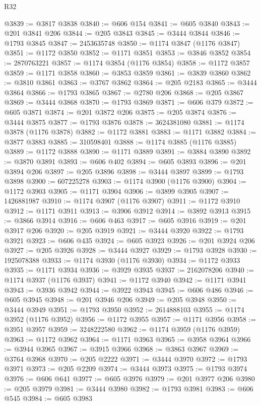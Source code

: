 \begin{lexlean}{R32}
\begin{coremodule}
@3839 := @3817 @3838
@3840 := @606 @154
@3841 := @605 @3840
@3843 := @201 @3841 @206
@3844 := @205 @3843
@3845 := @3444 @3844
@3846 := @1793 @3845
@3847 := 2453635748
@3850 := @1174 @3847 (@1176 @3847)
@3851 := @1172 @3850
@3852 := @1171 @3851
@3853 := @3846 @3852
@3854 := 2870763221
@3857 := @1174 @3854 (@1176 @3854)
@3858 := @1172 @3857
@3859 := @1171 @3858
@3860 := @3853 @3859
@3861 := @3839 @3860
@3862 := @3810 @3861
@3863 := @3767 @3862
@3864 := @205 @2183
@3865 := @3444 @3864
@3866 := @1793 @3865
@3867 := @2780 @206
@3868 := @205 @3867
@3869 := @3444 @3868
@3870 := @1793 @3869
@3871 := @606 @379
@3872 := @605 @3871
@3874 := @201 @3872 @206
@3875 := @205 @3874
@3876 := @3444 @3875
@3877 := @1793 @3876
@3878 := 3624381080
@3881 := @1174 @3878 (@1176 @3878)
@3882 := @1172 @3881
@3883 := @1171 @3882
@3884 := @3877 @3883
@3885 := 310598401
@3888 := @1174 @3885 (@1176 @3885)
@3889 := @1172 @3888
@3890 := @1171 @3889
@3891 := @3884 @3890
@3892 := @3870 @3891
@3893 := @606 @402
@3894 := @605 @3893
@3896 := @201 @3894 @206
@3897 := @205 @3896
@3898 := @3444 @3897
@3899 := @1793 @3898
@3900 := 607225278
@3903 := @1174 @3900 (@1176 @3900)
@3904 := @1172 @3903
@3905 := @1171 @3904
@3906 := @3899 @3905
@3907 := 1426881987
@3910 := @1174 @3907 (@1176 @3907)
@3911 := @1172 @3910
@3912 := @1171 @3911
@3913 := @3906 @3912
@3914 := @3892 @3913
@3915 := @3866 @3914
@3916 := @606 @463
@3917 := @605 @3916
@3919 := @201 @3917 @206
@3920 := @205 @3919
@3921 := @3444 @3920
@3922 := @1793 @3921
@3923 := @606 @435
@3924 := @605 @3923
@3926 := @201 @3924 @206
@3927 := @205 @3926
@3928 := @3444 @3927
@3929 := @1793 @3928
@3930 := 1925078388
@3933 := @1174 @3930 (@1176 @3930)
@3934 := @1172 @3933
@3935 := @1171 @3934
@3936 := @3929 @3935
@3937 := 2162078206
@3940 := @1174 @3937 (@1176 @3937)
@3941 := @1172 @3940
@3942 := @1171 @3941
@3943 := @3936 @3942
@3944 := @3922 @3943
@3945 := @606 @486
@3946 := @605 @3945
@3948 := @201 @3946 @206
@3949 := @205 @3948
@3950 := @3444 @3949
@3951 := @1793 @3950
@3952 := 2614888103
@3955 := @1174 @3952 (@1176 @3952)
@3956 := @1172 @3955
@3957 := @1171 @3956
@3958 := @3951 @3957
@3959 := 3248222580
@3962 := @1174 @3959 (@1176 @3959)
@3963 := @1172 @3962
@3964 := @1171 @3963
@3965 := @3958 @3964
@3966 := @3944 @3965
@3967 := @3915 @3966
@3968 := @3863 @3967
@3969 := @3764 @3968
@3970 := @205 @2222
@3971 := @3444 @3970
@3972 := @1793 @3971
@3973 := @205 @2209
@3974 := @3444 @3973
@3975 := @1793 @3974
@3976 := @606 @641
@3977 := @605 @3976
@3979 := @201 @3977 @206
@3980 := @205 @3979
@3981 := @3444 @3980
@3982 := @1793 @3981
@3983 := @606 @545
@3984 := @605 @3983

\end{coremodule}
\end{lexlean}
